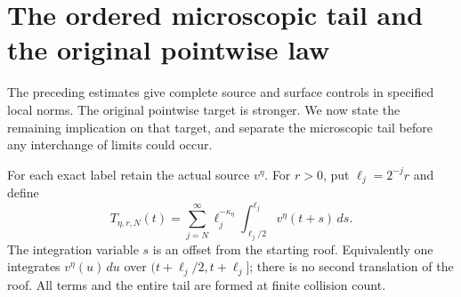 \section{The ordered microscopic tail and the original pointwise law}
\label{sec:v83-pointwise}
The preceding estimates give complete source and surface controls in
specified local norms. The original pointwise target is stronger.
We now state the remaining implication on that target, and separate
the microscopic tail before any interchange of limits could occur.

For each exact label retain the actual source $v^\eta$. For $r>0$,
put $\ell_j=2^{-j}r$ and define
\begin{equation}\label{eq:v83-dyadic-tail}
 T_{\eta,r,N}(t)=\sum_{j=N}^{\infty}\ell_j^{-\kappa_\eta}
                  \int_{\ell_j/2}^{\ell_j}v^\eta(t+s)\,ds.
\end{equation}
The integration variable $s$ is an offset from the starting roof.
Equivalently one integrates $v^\eta(u)\,du$ over
$(t+\ell_j/2,t+\ell_j]$; there is no second translation of the roof.
All terms and the entire tail are formed at finite collision count.

